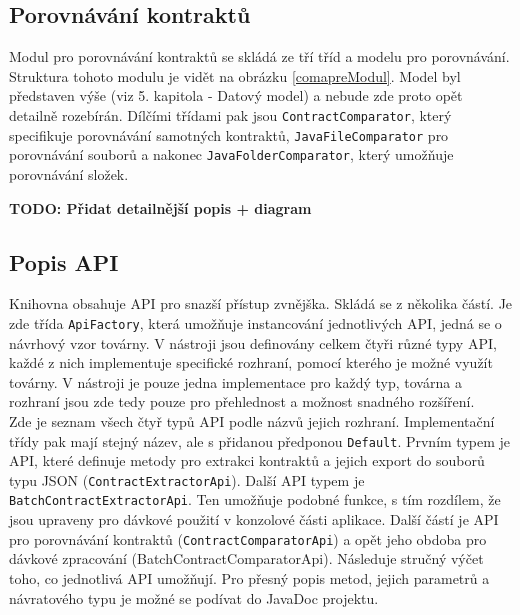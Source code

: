 	    \subsection{Porovnávání kontraktů}
	    	Modul pro porovnávání kontraktů se skládá ze tří tříd a modelu pro porovnávání. Struktura tohoto modulu je vidět na obrázku \ref{comapreModul}. Model byl představen výše (viz 5. kapitola - Datový model) a nebude zde proto opět detailně rozebírán. Dílčími třídami pak jsou \texttt{ContractComparator}, který specifikuje porovnávání samotných kontraktů, \texttt{JavaFileComparator} pro porovnávání souborů a nakonec \texttt{JavaFolderComparator}, který umožňuje porovnávání složek.
	    	
	    \textbf{\textcolor{pblue}{TODO: Přidat detailnější popis + diagram}}\\	


	    \subsection{Popis API}
	    	Knihovna obsahuje API pro snazší přístup zvnějška. Skládá se z několika částí. Je zde třída \texttt{ApiFactory}, která umožňuje instancování jednotlivých API, jedná se o návrhový vzor továrny. V nástroji jsou definovány celkem čtyři různé typy API, každé z nich implementuje specifické rozhraní, pomocí kterého je možné využít továrny. V nástroji je pouze jedna implementace pro každý typ, továrna a rozhraní jsou zde tedy pouze pro přehlednost a možnost snadného rozšíření.\\
	    	
	    	Zde je seznam všech čtyř typů API podle názvů jejich rozhraní. Implementační třídy pak mají stejný název, ale s přidanou předponou \texttt{Default}. Prvním typem je API, které definuje metody pro extrakci kontraktů a jejich export do souborů typu JSON (\texttt{ContractExtractorApi}). Další API typem je \texttt{BatchContractExtractorApi}. Ten umožňuje podobné funkce, s tím rozdílem, že jsou upraveny pro dávkové použití v konzolové části aplikace. Další částí je API pro porovnávání kontraktů (\texttt{ContractComparatorApi}) a opět jeho obdoba pro dávkové zpracování (BatchContractComparatorApi). Následuje stručný výčet toho, co jednotlivá API umožňují. Pro přesný popis metod, jejich parametrů a návratového typu je možné se podívat do JavaDoc projektu.
	    
